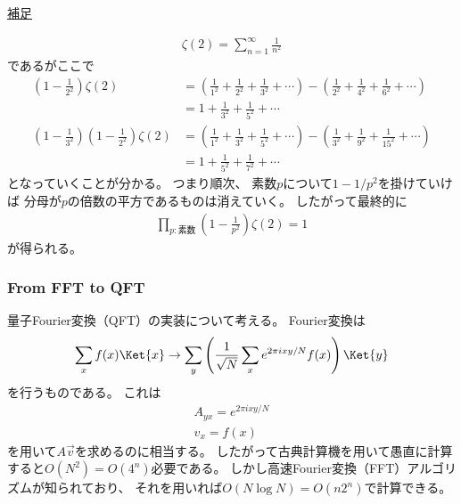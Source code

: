 \documentclass[a4paper, 10pt]{jsarticle}
\begin{document}
\begin{tcolorbox}[
enhanced,
colback = white,
boxrule = 0.5pt,
arc=2mm,
breakable
]
	\underline{補足}

	\begin{align}
		\zeta(2) = \sum_{n = 1}^\infty \frac{1}{n^2}
	\end{align}
	であるがここで
	\begin{align}
		\left( 1 - \frac{1}{2^2} \right) \zeta(2)
		&= \left( \frac{1}{1^2} + \frac{1}{2^2} + \frac{1}{3^2}
		+ \cdots \right)
		- \left( \frac{1}{2^2} + \frac{1}{4^2} + \frac{1}{6^2}
		+ \cdots \right) \\
		&= 1 + \frac{1}{3^2} + \frac{1}{5^2} + \cdots \\
		\left( 1 - \frac{1}{3^2} \right)
		\left( 1 - \frac{1}{2^2} \right) \zeta(2)
		&= \left( \frac{1}{1^2} + \frac{1}{3^2} + \frac{1}{5^2}
		+ \cdots \right)
		- \left( \frac{1}{3^2} + \frac{1}{9^2} + \frac{1}{15^2}
		+ \cdots \right) \\
		&= 1 + \frac{1}{5^2} + \frac{1}{7^2} + \cdots
	\end{align}
	となっていくことが分かる。
	つまり順次、
	素数$p$について$1 - 1/p^2$を掛けていけば
	分母が$p$の倍数の平方であるものは消えていく。
	したがって最終的に
	\begin{align}
		\prod_{p: \text{素数}} \left( 1 - \frac{1}{p^2} \right) \zeta(2)
		= 1
	\end{align}
	が得られる。
\end{tcolorbox}

\subsubsection{From FFT to QFT}
量子Fourier変換（QFT）の実装について考える。
Fourier変換は
\begin{align}
	\sum_x f(x) \Ket{x}
	\to \sum_y \left( \frac{1}{\sqrt{N}}
	\sum_x e^{2\pi i xy /N} f(x) \right) \Ket{y}
	\label{eq:FT}
\end{align}
を行うものである。
これは
\begin{gather}
	A_{yx} = e^{2\pi i xy/N} \\
	v_x = f(x)
\end{gather}
を用いて$A \vec{v}$を求めるのに相当する。
したがって古典計算機を用いて愚直に計算すると$O (N^2) = O(4^n)$必要である。
しかし高速Fourier変換（FFT）アルゴリズムが知られており、
それを用いれば$O (N \log N) = O (n 2^n)$で計算できる。
\end{document}
